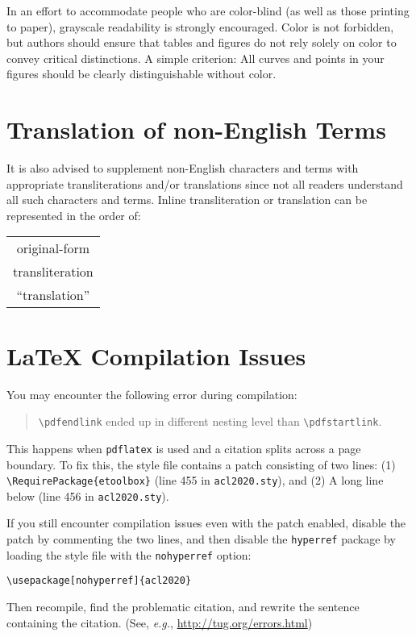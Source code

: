 \documentclass[11pt,a4paper]{article}
\begin{document}
In an effort to accommodate people who are color-blind (as well as those printing to paper), grayscale readability is strongly encouraged.
Color is not forbidden, but authors should ensure that tables and figures do not rely solely on color to convey critical distinctions.
A simple criterion:
All curves and points in your figures should be clearly distinguishable without color.

\section{Translation of non-English Terms}

It is also advised to supplement non-English characters and terms with appropriate transliterations and/or translations since not all readers understand all such characters and terms.
Inline transliteration or translation can be represented in the order of:
\begin{center}
\begin{tabular}{c}
original-form \\
transliteration \\
``translation''
\end{tabular}
\end{center}

\section{\LaTeX{} Compilation Issues}
You may encounter the following error during compilation: 
\begin{quote}
{\small\verb|\pdfendlink|} ended up in different nesting level than {\small\verb|\pdfstartlink|}.
\end{quote}
This happens when \texttt{\small pdflatex} is used and a citation splits across a page boundary.
To fix this, the style file contains a patch consisting of two lines:
(1) {\small\verb|\RequirePackage{etoolbox}|} (line 455 in \texttt{\small acl2020.sty}), and
(2) A long line below (line 456 in \texttt{\small acl2020.sty}).

If you still encounter compilation issues even with the patch enabled, disable the patch by commenting the two lines, and then disable the \texttt{\small hyperref} package by loading the style file with the \texttt{\small nohyperref} option:

\noindent
{\small\verb|\usepackage[nohyperref]{acl2020}|}

\noindent
Then recompile, find the problematic citation, and rewrite the sentence containing the citation. (See, {\em e.g.}, \url{http://tug.org/errors.html})
\end{document}

